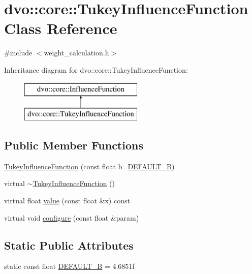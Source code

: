 \hypertarget{classdvo_1_1core_1_1_tukey_influence_function}{}\section{dvo\+:\+:core\+:\+:Tukey\+Influence\+Function Class Reference}
\label{classdvo_1_1core_1_1_tukey_influence_function}


{\ttfamily \#include $<$weight\+\_\+calculation.\+h$>$}

Inheritance diagram for dvo\+:\+:core\+:\+:Tukey\+Influence\+Function\+:\begin{figure}[H]
\begin{center}
\leavevmode
\includegraphics[height=2.000000cm]{classdvo_1_1core_1_1_tukey_influence_function}
\end{center}
\end{figure}
\subsection*{Public Member Functions}
\begin{DoxyCompactItemize}
\item 
\mbox{\hyperlink{classdvo_1_1core_1_1_tukey_influence_function_a5cce8b94396e7065d59fea7ef80fd768}{Tukey\+Influence\+Function}} (const float b=\mbox{\hyperlink{classdvo_1_1core_1_1_tukey_influence_function_a4abcd23e283b3152de20aaf8eb092e26}{D\+E\+F\+A\+U\+L\+T\+\_\+B}})
\item 
virtual \mbox{\hyperlink{classdvo_1_1core_1_1_tukey_influence_function_a754e8e9a16c391fa9234bc8c47183567}{$\sim$\+Tukey\+Influence\+Function}} ()
\item 
virtual float \mbox{\hyperlink{classdvo_1_1core_1_1_tukey_influence_function_a3a1829e6316ecffdceea8c54169c5ef1}{value}} (const float \&x) const
\item 
virtual void \mbox{\hyperlink{classdvo_1_1core_1_1_tukey_influence_function_afa49d538d3eee4c545bb690a0aca0f11}{configure}} (const float \&param)
\end{DoxyCompactItemize}
\subsection*{Static Public Attributes}
\begin{DoxyCompactItemize}
\item 
static const float \mbox{\hyperlink{classdvo_1_1core_1_1_tukey_influence_function_a4abcd23e283b3152de20aaf8eb092e26}{D\+E\+F\+A\+U\+L\+T\+\_\+B}} = 4.\+6851f
\end{DoxyCompactItemize}


